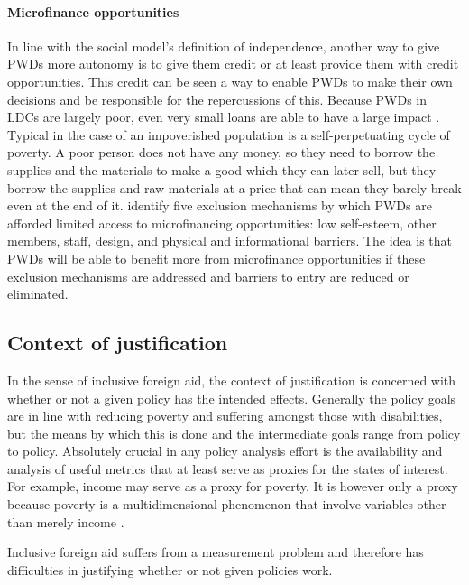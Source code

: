 \documentclass[a4paper]{article}
\begin{document}
\paragraph{Microfinance opportunities}

In line with the social model's definition of independence, another way to
give PWDs more autonomy is to give them credit or at least provide them with
credit opportunities. This credit can be seen a way to enable PWDs to make
their own decisions and be responsible for the repercussions of this. Because
PWDs in LDCs are largely poor, even very small loans are able to have a large
impact \citep{wendt2006building}.  Typical in the case of an impoverished
population is a self-perpetuating cycle of poverty. A poor person does not have
any money, so they need to borrow the supplies and the materials to make a
good which they can later sell, but they borrow the supplies and raw materials
at a price that can mean they barely break even at the end of it.
\cite{mersland2008access} identify five exclusion mechanisms by which PWDs are
afforded limited access to microfinancing opportunities: low self-esteem,
other members, staff, design, and physical and informational barriers. The
idea is that PWDs will be able to benefit more from microfinance opportunities
if these exclusion mechanisms are addressed and barriers to entry are reduced
or eliminated.

\subsection{Context of justification}

In the sense of inclusive foreign aid, the context of justification is
concerned with whether or not a given policy has the intended effects.
Generally the policy goals are in line with reducing poverty and suffering
amongst those with disabilities, but the means by which this is done and the
intermediate goals range from policy to policy. Absolutely crucial in any
policy analysis effort is the availability and analysis of useful metrics that
at least serve as proxies for the states of interest. For example, income may
serve as a proxy for poverty. It is however only a proxy because poverty is a
multidimensional phenomenon that involve variables other than merely income
\cite{alkire2011understandings}.

Inclusive foreign aid suffers from a measurement problem and therefore has
difficulties in justifying whether or not given policies work.
\end{document}
